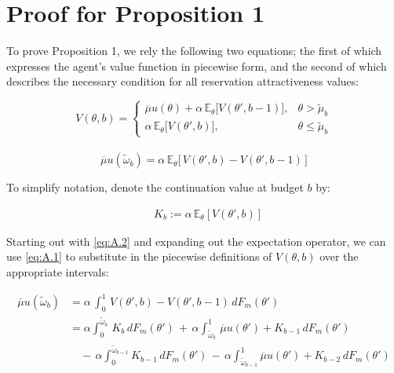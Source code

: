 \section{Proof for Proposition 1}
\label{appx: b} 
To prove Proposition 1, we rely the following two equations; the first of which expresses the agent's value function in piecewise form, and the second of which describes the necessary condition for all reservation attractiveness values:

\begin{equation}\label{eq:A.1}
    V(\theta, b)=\begin{cases} 
        \overline\mu u(\theta) +\alpha \,\mathbb{E}_{\theta}\Big[V(\theta', b-1)\Big],& \theta> \widetilde \mu_b \\[10pt]
        \alpha \,\mathbb{E}_{\theta}\Big[V(\theta', b)\Big],& \theta\leq\widetilde \mu_b
    \end{cases}  
\end{equation}\\


\begin{equation}\label{eq:A.2}
    \overline\mu u(\widetilde\omega_b) = \alpha \, \mathbb{E}_\theta\Big[\,V(\theta',b)-V(\theta',b-1)\,\Big]  
\end{equation}
 
To simplify notation, denote the continuation value at budget $b$ by:

\begin{equation*}
    \begin{aligned}
        &K_{b}:=\alpha \,\mathbb{E}_{\theta}\left[V(\theta', b)\right] 
    \end{aligned} 
\end{equation*}

Starting out with \autoref{eq:A.2} and expanding out the expectation operator, we can use \ref{eq:A.1} to substitute in the piecewise definitions of $V(\theta,b)$ over the appropriate intervals:

\begin{equation}\label{eq:A.3}
    \begin{split}
        \overline\mu u(\widetilde\omega_b) &= \alpha \,\int^1_0\,V(\theta',b)-V(\theta',b-1)\,dF_m(\theta')\\
                                           &=\alpha \int^{\widetilde\omega_b}_0\,K_b\,dF_m(\theta') \,+\, \alpha \int^1_{\widetilde\omega_b}\,\overline\mu u(\theta') + K_{b-1}\,dF_m(\theta')\\ 
                                           & \quad -\,\alpha \int^{\widetilde\omega_{b-1}}_0 K_{b-1}\,dF_m(\theta') \,-\, \alpha \int^1_{\widetilde\omega_{b-1}} \overline\mu u(\theta') + K_{b-2}\,dF_m(\theta')
    \end{split}
\end{equation}

